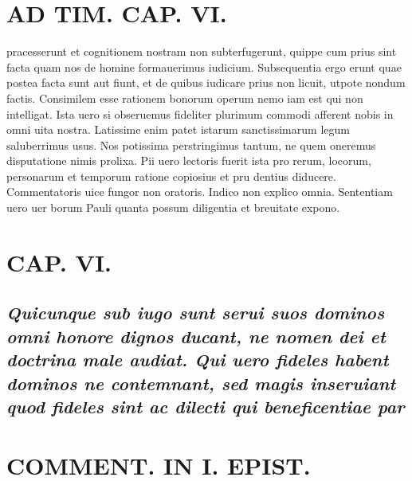 \documentclass{article}
\begin{document}
\begin{pages}
\section*{AD TIM. CAP. VI. }
\marginpar{[ p.162 ]}\pstart pracesserunt et cognitionem nostram non subterfugerunt, quippe cum prius sint facta quam nos de homine formauerimus iudicium. Subsequentia ergo erunt quae postea facta sunt aut fiunt, et de quibus iudicare prius non licuit, utpote nondum factis. Consimilem esse rationem bonorum operum nemo iam est qui non intelligat. Ista uero si obseruemus fideliter plurimum commodi afferent nobis in omni uita nostra. Latissime enim patet istarum sanctissimarum legum saluberrimus usus. Nos potissima perstringimus tantum, ne quem oneremus disputatione nimis prolixa. Pii uero lectoris fuerit ista pro rerum, locorum, personarum et temporum ratione copiosius et pru dentius diducere. Commentatoris uice fungor non oratoris. Indico non explico omnia. Sententiam uero uer borum Pauli quanta possum diligentia et breuitate expono.  \pend
\endnumbering\beginnumbering\section{CAP. VI.}
{}
\subsection*{\textit{Quicunque sub iugo sunt serui suos dominos omni honore dignos ducant, ne nomen dei et doctrina male audiat. Qui uero fideles habent dominos ne contemnant, sed magis inseruiant quod fideles sint ac dilecti qui beneficentiae par}}
\section*{COMMENT. IN I. EPIST. }
{}

\end{pages}
\end{document}
